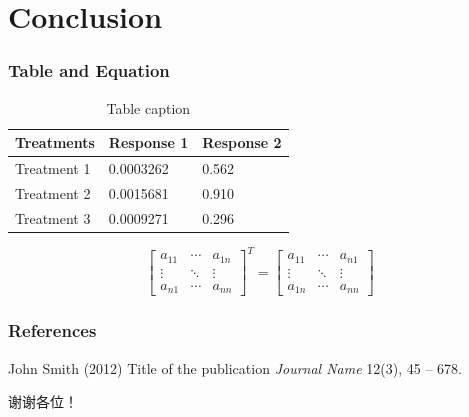 \documentclass[aspectratio=169]{beamer}
\begin{document}
\section{Conclusion}

\begin{frame}
\frametitle{Table and Equation}
\vspace{-0.3cm}
\begin{table}
\caption{Table caption}
\begin{tabular}{l l l}
\toprule
\textbf{Treatments} & \textbf{Response 1} & \textbf{Response 2}\\
\midrule
Treatment 1 & 0.0003262 & 0.562 \\
Treatment 2 & 0.0015681 & 0.910 \\
Treatment 3 & 0.0009271 & 0.296 \\
\bottomrule
\end{tabular}
\end{table}

\begin{equation} %
\label{eq:matrix_transpose}
\left[
\begin{array}{ccc}
a_{11} & \cdots & a_{1n} \\
\vdots & \ddots & \vdots \\
a_{n1} & \cdots & a_{nn}
\end{array}
\right]^T
=
\left[
\begin{array}{ccc}
a_{11} & \cdots & a_{n1} \\
\vdots & \ddots & \vdots \\
a_{1n} & \cdots & a_{nn}
\end{array}
\right]
\end{equation}
\end{frame}


\begin{frame}
\frametitle{References}
\footnotesize{
\begin{thebibliography}{99} %
 John Smith (2012)
\newblock Title of the publication
\newblock \emph{Journal Name} 12(3), 45 -- 678.
\end{thebibliography}
}
\end{frame}

\begin{frame}
谢谢各位！
\end{frame}
\end{document}

